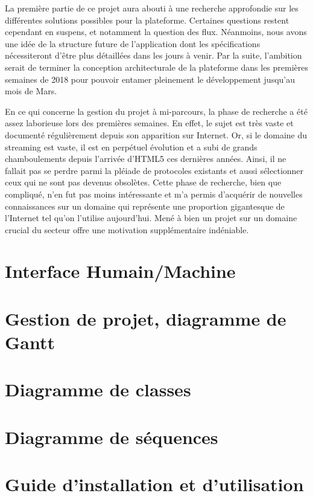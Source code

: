 \documentclass{polytech/polytech}
\begin{document}
La première partie de ce projet aura abouti à une recherche approfondie sur les différentes solutions possibles pour la plateforme. Certaines questions restent cependant en suspens, et notamment la question des flux. Néanmoins, nous avons une idée de la structure future de l’application dont les spécifications nécessiteront d’être plus détaillées dans les jours à venir. Par la suite, l’ambition serait de terminer la conception architecturale de la plateforme dans les premières semaines de 2018 pour pouvoir entamer pleinement le développement jusqu’au mois de Mars.

En ce qui concerne la gestion du projet à mi-parcours, la phase de recherche a été assez laborieuse lors des premières semaines. En effet, le sujet est très vaste et documenté régulièrement depuis son apparition sur Internet. Or, si le domaine du streaming est vaste, il est en perpétuel évolution et a subi de grands chamboulements depuis l’arrivée d’HTML5 ces dernières années. Ainsi, il ne fallait pas se perdre parmi la pléiade de protocoles existants et aussi sélectionner ceux qui ne sont pas devenus obsolètes. Cette phase de recherche, bien que compliqué, n’en fut pas moins intéressante et m’a permis d’acquérir de nouvelles connaissances sur un domaine qui représente une proportion gigantesque de l’Internet tel qu’on l’utilise aujourd’hui. Mené à bien un projet sur un domaine crucial du secteur offre une motivation supplémentaire indéniable.


\appendix

\chapter{Interface Humain/Machine}

\chapter{Gestion de projet, diagramme de Gantt}


\chapter{Diagramme de classes}


\chapter{Diagramme de séquences}


\chapter{Guide d'installation et d'utilisation}
\end{document}
